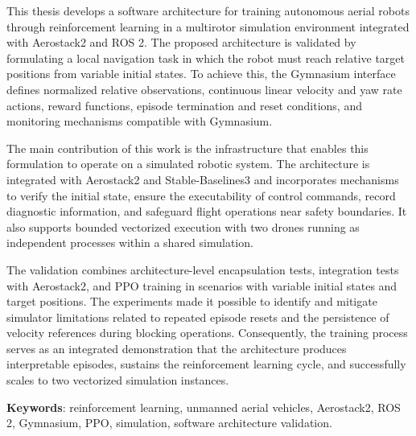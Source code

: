 This thesis develops a software architecture for training autonomous aerial
robots through reinforcement learning in a multirotor simulation environment integrated
 with Aerostack2 and ROS 2. The proposed architecture is validated by formulating 
 a local navigation task in which the robot must reach relative target positions 
 from variable initial states. To achieve this, the Gymnasium interface defines normalized 
 relative observations, continuous linear velocity and yaw rate actions, reward 
 functions, episode termination and reset conditions, and monitoring mechanisms 
 compatible with Gymnasium.

The main contribution of this work is the infrastructure that enables this 
formulation to operate on a simulated robotic system. The architecture is integrated 
with Aerostack2 and Stable-Baselines3 and incorporates mechanisms to verify the initial 
state, ensure the executability of control commands, record diagnostic information, 
and safeguard flight operations near safety boundaries. It also supports bounded vectorized
 execution with two drones running as independent processes within a shared simulation.

The validation combines architecture-level encapsulation tests, integration tests with Aerostack2,
 and PPO training in scenarios with variable initial states and target positions. 
 The experiments made it possible to identify and mitigate simulator limitations related 
 to repeated episode resets and the persistence of velocity references during blocking
  operations. Consequently, the training process serves as an integrated demonstration 
  that the architecture produces interpretable episodes, sustains the reinforcement 
  learning cycle, and successfully scales to two vectorized simulation instances.

\textbf{Keywords}: reinforcement learning, unmanned aerial vehicles,
Aerostack2, ROS 2, Gymnasium, PPO, simulation, software architecture validation.
